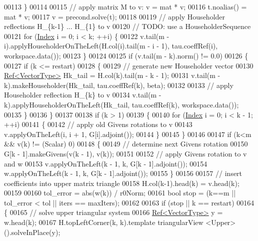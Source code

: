 \begin{DoxyCode}
00113     \}
00114 
00115     \textcolor{comment}{// apply matrix M to v:  v = mat * v;}
00116     t.noalias() = mat * v;
00117     v = precond.solve(t);
00118 
00119     \textcolor{comment}{// apply Householder reflections H\_\{k-1\} ... H\_\{1\} to v}
00120     \textcolor{comment}{// TODO: use a HouseholderSequence}
00121     \textcolor{keywordflow}{for} (\hyperlink{namespace_eigen_a62e77e0933482dafde8fe197d9a2cfde}{Index} i = 0; i < k; ++i) \{
00122       v.tail(m - i).applyHouseholderOnTheLeft(H.col(i).tail(m - i - 1), tau.coeffRef(i), workspace.data());
00123     \}
00124 
00125     \textcolor{keywordflow}{if} (v.tail(m - k).norm() != 0.0)
00126     \{
00127       \textcolor{keywordflow}{if} (k <= restart)
00128       \{
00129         \textcolor{comment}{// generate new Householder vector}
00130         \hyperlink{group___core___module_class_eigen_1_1_ref}{Ref<VectorType>} Hk\_tail = H.col(k).tail(m - k - 1);
00131         v.tail(m - k).makeHouseholder(Hk\_tail, tau.coeffRef(k), beta);
00132 
00133         \textcolor{comment}{// apply Householder reflection H\_\{k\} to v}
00134         v.tail(m - k).applyHouseholderOnTheLeft(Hk\_tail, tau.coeffRef(k), workspace.data());
00135       \}
00136     \}
00137 
00138     \textcolor{keywordflow}{if} (k > 1)
00139     \{
00140       \textcolor{keywordflow}{for} (\hyperlink{namespace_eigen_a62e77e0933482dafde8fe197d9a2cfde}{Index} i = 0; i < k - 1; ++i)
00141       \{
00142         \textcolor{comment}{// apply old Givens rotations to v}
00143         v.applyOnTheLeft(i, i + 1, G[i].adjoint());
00144       \}
00145     \}
00146 
00147     \textcolor{keywordflow}{if} (k<m && v(k) != (Scalar) 0)
00148     \{
00149       \textcolor{comment}{// determine next Givens rotation}
00150       G[k - 1].makeGivens(v(k - 1), v(k));
00151 
00152       \textcolor{comment}{// apply Givens rotation to v and w}
00153       v.applyOnTheLeft(k - 1, k, G[k - 1].adjoint());
00154       w.applyOnTheLeft(k - 1, k, G[k - 1].adjoint());
00155     \}
00156 
00157     \textcolor{comment}{// insert coefficients into upper matrix triangle}
00158     H.col(k-1).head(k) = v.head(k);
00159 
00160     tol\_error = abs(w(k)) / r0Norm;
00161     \textcolor{keywordtype}{bool} stop = (k==m || tol\_error < tol || iters == maxIters);
00162 
00163     \textcolor{keywordflow}{if} (stop || k == restart)
00164     \{
00165       \textcolor{comment}{// solve upper triangular system}
00166       \hyperlink{group___core___module_class_eigen_1_1_ref}{Ref<VectorType>} y = w.head(k);
00167       H.topLeftCorner(k, k).template triangularView <Upper>().solveInPlace(y);

\end{DoxyCode}
